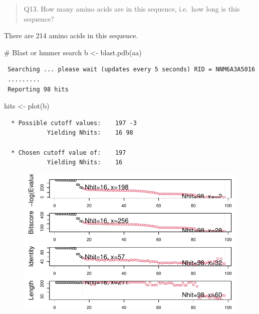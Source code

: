 \documentclass[
  letterpaper,
  DIV=11,
  numbers=noendperiod]{scrartcl}
\newenvironment{Shaded}{\begin{snugshade}}{\end{snugshade}}
\newcommand{\CommentTok}[1]{\textcolor[rgb]{0.37,0.37,0.37}{#1}}
\newcommand{\FunctionTok}[1]{\textcolor[rgb]{0.28,0.35,0.67}{#1}}
\newcommand{\NormalTok}[1]{\textcolor[rgb]{0.00,0.23,0.31}{#1}}
\newcommand{\OtherTok}[1]{\textcolor[rgb]{0.00,0.23,0.31}{#1}}
\begin{document}
\begin{quote}
Q13. How many amino acids are in this sequence, i.e.~how long is this
sequence?
\end{quote}

There are 214 amino acids in this sequence.

\begin{Shaded}
\begin{Highlighting}[]
\CommentTok{\# Blast or hmmer search}
\NormalTok{b }\OtherTok{\textless{}{-}} \FunctionTok{blast.pdb}\NormalTok{(aa)}
\end{Highlighting}
\end{Shaded}

\begin{verbatim}
 Searching ... please wait (updates every 5 seconds) RID = NNM6A3A5016 
 .........
 Reporting 98 hits
\end{verbatim}

\begin{Shaded}
\begin{Highlighting}[]
\NormalTok{hits }\OtherTok{\textless{}{-}}  \FunctionTok{plot}\NormalTok{(b)}
\end{Highlighting}
\end{Shaded}

\begin{verbatim}
  * Possible cutoff values:    197 -3 
            Yielding Nhits:    16 98 

  * Chosen cutoff value of:    197 
            Yielding Nhits:    16 
\end{verbatim}

\begin{figure}[H]

{\centering \includegraphics{class09_files/figure-pdf/unnamed-chunk-8-1.pdf}

}

\end{figure}
\end{document}
